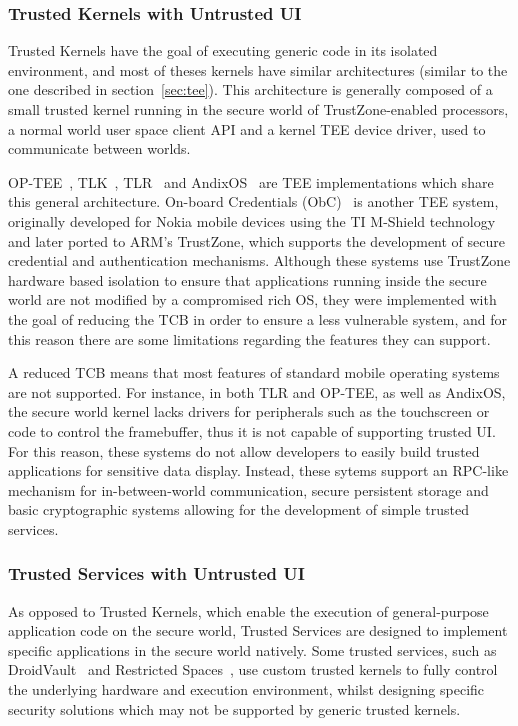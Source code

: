 \subsubsection{Trusted Kernels with Untrusted UI}

Trusted Kernels have the goal of executing generic code in its isolated environment, and most of theses kernels have similar architectures (similar to the one described in section~\ref{sec:tee}). This architecture is generally composed of a small trusted kernel running in the secure world of TrustZone-enabled processors, a normal world user space client API and a kernel TEE device driver, used to communicate between worlds.

OP-TEE~\cite{op_tee}, TLK~\cite{tlk}, TLR~\cite{santos2011trusted} and AndixOS~\cite{fitzekandix} are \ac{TEE} implementations which share this general architecture. On-board Credentials (ObC)~\cite{kostiainen2012board} is another \ac{TEE} system, originally developed for Nokia mobile devices using the TI M-Shield technology and later ported to ARM's TrustZone, which supports the development of secure credential and authentication mechanisms. Although these systems use TrustZone hardware based isolation to ensure that applications running inside the secure world are not modified by a compromised rich OS, they were implemented with the goal of reducing the \ac{TCB} in order to ensure a less vulnerable system, and for this reason there are some limitations regarding the features they can support.

A reduced \ac{TCB} means that most features of standard mobile operating systems are not supported. For instance, in both TLR and OP-TEE, as well as AndixOS, the secure world kernel lacks drivers for peripherals such as the touchscreen or code to control the framebuffer, thus it is not capable of supporting trusted UI. For this reason, these systems do not allow developers to easily build trusted applications for sensitive data display. Instead, these sytems support an RPC-like mechanism for in-between-world communication, secure persistent storage and basic cryptographic systems allowing for the development of simple trusted services.

\subsubsection{Trusted Services with Untrusted UI}

As opposed to Trusted Kernels, which enable the execution of general-purpose application code on the secure world, Trusted Services are designed to implement specific applications in the secure world natively.
Some trusted services, such as DroidVault~\cite{li2014droidvault} and Restricted Spaces~\cite{brasserregulating}, use custom trusted kernels to fully control the underlying hardware and execution environment, whilst designing specific security solutions which may not be supported by generic trusted kernels.


